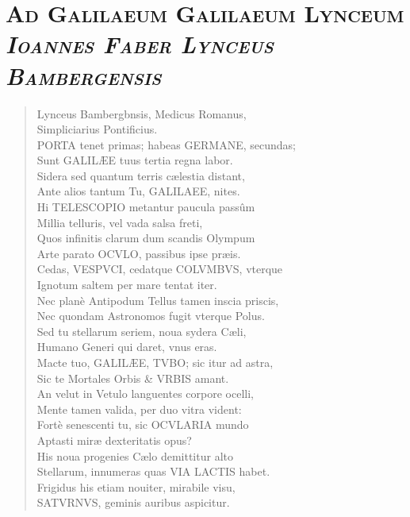 \documentclass[11pt,twoside,openany]{book}
\begin{document}
\section*{\centering\scshape Ad Galilaeum Galilaeum Lynceum\\{\small\itshape Ioannes Faber Lynceus Bambergensis}}
\begin{otherlanguage}{latin}
\begin{verse}

Lynceus Bambergbnsis, Medicus Romanus, \\
Simpliciarius Pontificius. \\
PORTA tenet primas; habeas GERMANE, secundas; \\
Sunt GALILÆE tuus tertia regna labor. \\
Sidera sed quantum terris cælestia distant, \\
Ante alios tantum Tu, GALILAEE, nites. \\
Hi TELESCOPIO metantur paucula passûm \\
Millia telluris, vel vada salsa freti, \\
Quos infinitis clarum dum scandis Olympum \\
Arte parato OCVLO, passibus ipse præis. \\
Cedas, VESPVCI, cedatque COLVMBVS, vterque \\
Ignotum saltem per mare tentat iter. \\
Nec planè Antipodum Tellus tamen inscia priscis, \\
Nec quondam Astronomos fugit vterque Polus. \\
Sed tu stellarum seriem, noua sydera Cæli, \\
Humano Generi qui daret, vnus eras. \\
Macte tuo, GALILÆE, TVBO; sic itur ad astra, \\
Sic te Mortales Orbis \& VRBIS amant. \\
An velut in Vetulo languentes corpore ocelli, \\
Mente tamen valida, per duo vitra vident: \\
Fortè senescenti tu, sic OCVLARIA mundo \\
Aptasti miræ dexteritatis opus? \\
His noua progenies Cælo demittitur alto \\
Stellarum, innumeras quas VIA LACTIS habet. \\
Frigidus his etiam nouiter, mirabile visu, \\
SATVRNVS, geminis auribus aspicitur. \\

\end{verse}
\end{otherlanguage}
\end{document}
